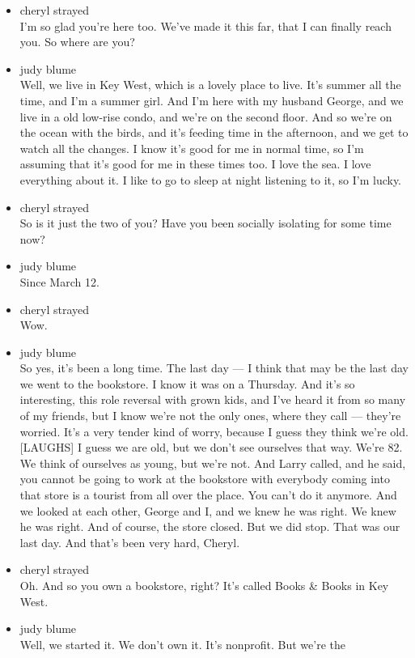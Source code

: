 \begin{itemize}
\item
  cheryl strayed\\
  I'm so glad you're here too. We've made it this far, that I can
  finally reach you. So where are you?
\item
  judy blume\\
  Well, we live in Key West, which is a lovely place to live. It's
  summer all the time, and I'm a summer girl. And I'm here with my
  husband George, and we live in a old low-rise condo, and we're on the
  second floor. And so we're on the ocean with the birds, and it's
  feeding time in the afternoon, and we get to watch all the changes. I
  know it's good for me in normal time, so I'm assuming that it's good
  for me in these times too. I love the sea. I love everything about it.
  I like to go to sleep at night listening to it, so I'm lucky.
\item
  cheryl strayed\\
  So is it just the two of you? Have you been socially isolating for
  some time now?
\item
  judy blume\\
  Since March 12.
\item
  cheryl strayed\\
  Wow.
\item
  judy blume\\
  So yes, it's been a long time. The last day --- I think that may be
  the last day we went to the bookstore. I know it was on a Thursday.
  And it's so interesting, this role reversal with grown kids, and I've
  heard it from so many of my friends, but I know we're not the only
  ones, where they call --- they're worried. It's a very tender kind of
  worry, because I guess they think we're old. {[}LAUGHS{]} I guess we
  are old, but we don't see ourselves that way. We're 82. We think of
  ourselves as young, but we're not. And Larry called, and he said, you
  cannot be going to work at the bookstore with everybody coming into
  that store is a tourist from all over the place. You can't do it
  anymore. And we looked at each other, George and I, and we knew he was
  right. We knew he was right. And of course, the store closed. But we
  did stop. That was our last day. And that's been very hard, Cheryl.
\item
  cheryl strayed\\
  Oh. And so you own a bookstore, right? It's called Books \& Books in
  Key West.
\item
  judy blume\\
  Well, we started it. We don't own it. It's nonprofit. But we're the

\end{itemize}
